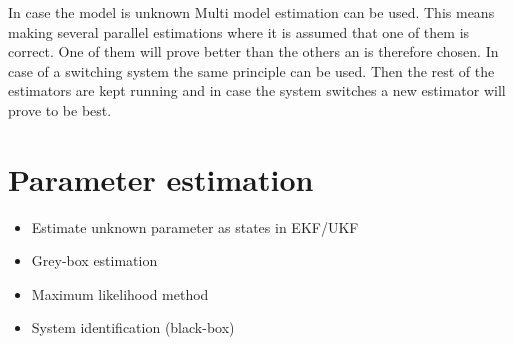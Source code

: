 In case the model is unknown Multi model estimation can be used. This means making several parallel estimations where it is assumed that one of them is correct. One of them will prove better than the others an is therefore chosen. In case of a switching system the same principle can be used. Then the rest of the estimators are kept running and in case the system switches a new estimator will prove to be best.

\section*{Parameter estimation}
\begin{itemize}
        \item Estimate unknown parameter as states in EKF/UKF
        \item Grey-box estimation
        \item Maximum likelihood method
        \item System identification (black-box)
\end{itemize}


